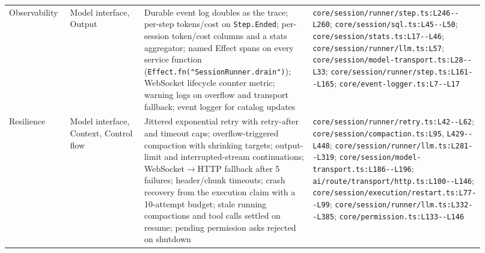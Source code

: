 \begin{longtable}{@{}p{0.13\linewidth}p{0.17\linewidth}p{0.36\linewidth}p{0.26\linewidth}@{}}
Observability & Model interface, Output & Durable event log doubles as the trace; per-step tokens/cost on \texttt{Step.\allowbreak{}Ended}; per-session token/cost columns and a stats aggregator; named Effect spans on every service function (\texttt{Effect.\allowbreak{}fn(\allowbreak{}"SessionRunner.\allowbreak{}drain")}); WebSocket lifecycle counter metric; warning logs on overflow and transport fallback; event logger for catalog updates & \texttt{core/\allowbreak{}session/\allowbreak{}runner/\allowbreak{}step.\allowbreak{}ts:\allowbreak{}L246-\allowbreak{}-\allowbreak{}L260}; \texttt{core/\allowbreak{}session/\allowbreak{}sql.\allowbreak{}ts:\allowbreak{}L45-\allowbreak{}-\allowbreak{}L50}; \texttt{core/\allowbreak{}session/\allowbreak{}stats.\allowbreak{}ts:\allowbreak{}L17-\allowbreak{}-\allowbreak{}L46}; \texttt{core/\allowbreak{}session/\allowbreak{}runner/\allowbreak{}llm.\allowbreak{}ts:\allowbreak{}L57}; \texttt{core/\allowbreak{}session/\allowbreak{}model-\allowbreak{}transport.\allowbreak{}ts:\allowbreak{}L28-\allowbreak{}-\allowbreak{}L33}; \texttt{core/\allowbreak{}session/\allowbreak{}runner/\allowbreak{}step.\allowbreak{}ts:\allowbreak{}L161-\allowbreak{}-\allowbreak{}L165}; \texttt{core/\allowbreak{}event-\allowbreak{}logger.\allowbreak{}ts:\allowbreak{}L7-\allowbreak{}-\allowbreak{}L17} \\
Resilience & Model interface, Context, Control flow & Jittered exponential retry with retry-after and timeout caps; overflow-triggered compaction with shrinking targets; output-limit and interrupted-stream continuations; WebSocket$\rightarrow$HTTP fallback after 5 failures; header/chunk timeouts; crash recovery from the execution claim with a 10-attempt budget; stale running compactions and tool calls settled on resume; pending permission asks rejected on shutdown & \texttt{core/\allowbreak{}session/\allowbreak{}runner/\allowbreak{}retry.\allowbreak{}ts:\allowbreak{}L42-\allowbreak{}-\allowbreak{}L62}; \texttt{core/\allowbreak{}session/\allowbreak{}compaction.\allowbreak{}ts:\allowbreak{}L95}, \texttt{L429-\allowbreak{}-\allowbreak{}L448}; \texttt{core/\allowbreak{}session/\allowbreak{}runner/\allowbreak{}llm.\allowbreak{}ts:\allowbreak{}L281-\allowbreak{}-\allowbreak{}L319}; \texttt{core/\allowbreak{}session/\allowbreak{}model-\allowbreak{}transport.\allowbreak{}ts:\allowbreak{}L186-\allowbreak{}-\allowbreak{}L196}; \texttt{ai/\allowbreak{}route/\allowbreak{}transport/\allowbreak{}http.\allowbreak{}ts:\allowbreak{}L100-\allowbreak{}-\allowbreak{}L146}; \texttt{core/\allowbreak{}session/\allowbreak{}execution/\allowbreak{}restart.\allowbreak{}ts:\allowbreak{}L77-\allowbreak{}-\allowbreak{}L99}; \texttt{core/\allowbreak{}session/\allowbreak{}runner/\allowbreak{}llm.\allowbreak{}ts:\allowbreak{}L332-\allowbreak{}-\allowbreak{}L385}; \texttt{core/\allowbreak{}permission.\allowbreak{}ts:\allowbreak{}L133-\allowbreak{}-\allowbreak{}L146} \\

\end{longtable}
